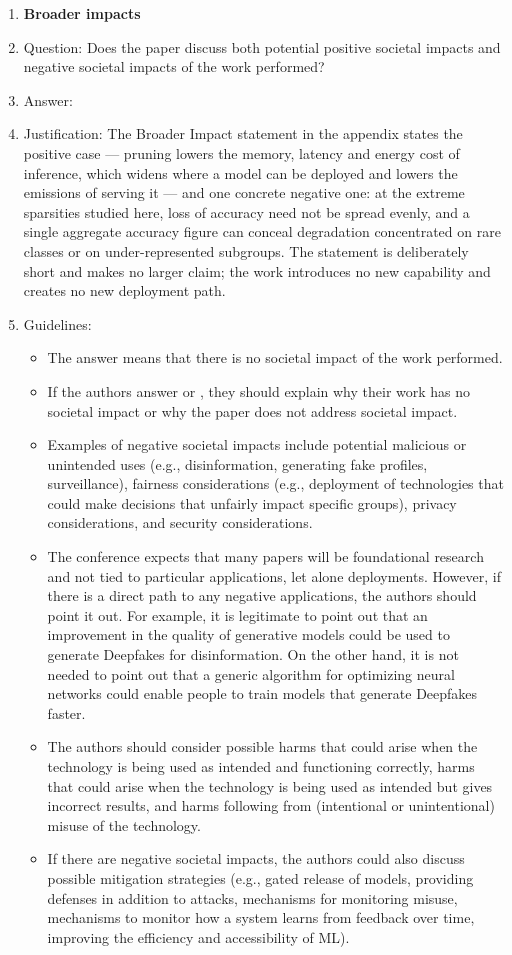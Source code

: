 \begin{enumerate}
\item {\bf Broader impacts}
    \item[] Question: Does the paper discuss both potential positive societal impacts and negative societal impacts of the work performed?
    \item[] Answer: \answerYes{}
    \item[] Justification: The Broader Impact statement in the appendix states the positive case --- pruning lowers the memory, latency and energy cost of inference, which widens where a model can be deployed and lowers the emissions of serving it --- and one concrete negative one: at the extreme sparsities studied here, loss of accuracy need not be spread evenly, and a single aggregate accuracy figure can conceal degradation concentrated on rare classes or on under-represented subgroups. The statement is deliberately short and makes no larger claim; the work introduces no new capability and creates no new deployment path.
    \item[] Guidelines:
    \begin{itemize}
        \item The answer \answerNA{} means that there is no societal impact of the work performed.
        \item If the authors answer \answerNA{} or \answerNo, they should explain why their work has no societal impact or why the paper does not address societal impact.
        \item Examples of negative societal impacts include potential malicious or unintended uses (e.g., disinformation, generating fake profiles, surveillance), fairness considerations (e.g., deployment of technologies that could make decisions that unfairly impact specific groups), privacy considerations, and security considerations.
        \item The conference expects that many papers will be foundational research and not tied to particular applications, let alone deployments. However, if there is a direct path to any negative applications, the authors should point it out. For example, it is legitimate to point out that an improvement in the quality of generative models could be used to generate Deepfakes for disinformation. On the other hand, it is not needed to point out that a generic algorithm for optimizing neural networks could enable people to train models that generate Deepfakes faster.
        \item The authors should consider possible harms that could arise when the technology is being used as intended and functioning correctly, harms that could arise when the technology is being used as intended but gives incorrect results, and harms following from (intentional or unintentional) misuse of the technology.
        \item If there are negative societal impacts, the authors could also discuss possible mitigation strategies (e.g., gated release of models, providing defenses in addition to attacks, mechanisms for monitoring misuse, mechanisms to monitor how a system learns from feedback over time, improving the efficiency and accessibility of ML).
    \end{itemize}


\end{enumerate}
